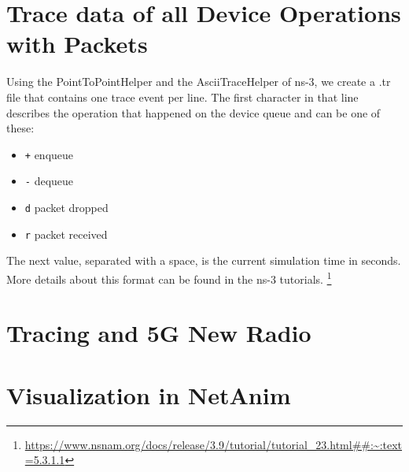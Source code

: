 \section{Trace data of all Device Operations with Packets}
Using the PointToPointHelper and the AsciiTraceHelper of ns-3, we create a .tr file that contains one trace event per line. 
The first character in that line describes the operation that happened on the device queue and can be one of these:
\begin{itemize}
    \item \texttt{+} enqueue
    \item \texttt{-} dequeue
    \item \texttt{d} packet dropped
    \item \texttt{r} packet received
\end{itemize}
The next value, separated with a space, is the current simulation time in seconds.
More details about this format can be found in the ns-3 tutorials. \footnote[11]{\url{https://www.nsnam.org/docs/release/3.9/tutorial/tutorial_23.html##:~:text=5.3.1.1}}

\section{Tracing and 5G New Radio}
\section{Visualization in NetAnim}








